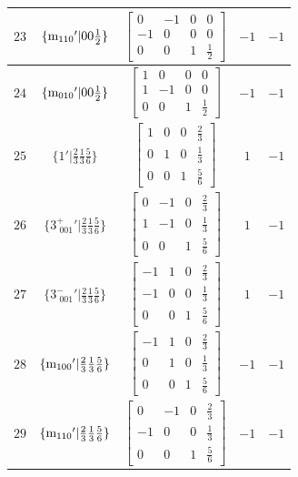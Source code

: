 \documentclass[fleqn,8pt]{jsarticle}
\begin{document}
\begin{longtable}{ccccc}
$ 23 $ & $ \{{\rm m}_{110}{}'|0 0 \frac{1}{2}\} $ & $ \begin{bmatrix} 0 & -1 & 0 & 0 \\ -1 & 0 & 0 & 0 \\ 0 & 0 & 1 & \frac{1}{2} \end{bmatrix} $ & $ -1 $ & $ -1 $ \\ \hline
$ 24 $ & $ \{{\rm m}_{010}{}'|0 0 \frac{1}{2}\} $ & $ \begin{bmatrix} 1 & 0 & 0 & 0 \\ 1 & -1 & 0 & 0 \\ 0 & 0 & 1 & \frac{1}{2} \end{bmatrix} $ & $ -1 $ & $ -1 $ \\ \hline
$ 25 $ & $ \{1{}'|\frac{2}{3} \frac{1}{3} \frac{5}{6}\} $ & $ \begin{bmatrix} 1 & 0 & 0 & \frac{2}{3} \\ 0 & 1 & 0 & \frac{1}{3} \\ 0 & 0 & 1 & \frac{5}{6} \end{bmatrix} $ & $ 1 $ & $ -1 $ \\ \hline
$ 26 $ & $ \{3^{+}_{\,\,001}{}'|\frac{2}{3} \frac{1}{3} \frac{5}{6}\} $ & $ \begin{bmatrix} 0 & -1 & 0 & \frac{2}{3} \\ 1 & -1 & 0 & \frac{1}{3} \\ 0 & 0 & 1 & \frac{5}{6} \end{bmatrix} $ & $ 1 $ & $ -1 $ \\ \hline
$ 27 $ & $ \{3^{-}_{\,\,001}{}'|\frac{2}{3} \frac{1}{3} \frac{5}{6}\} $ & $ \begin{bmatrix} -1 & 1 & 0 & \frac{2}{3} \\ -1 & 0 & 0 & \frac{1}{3} \\ 0 & 0 & 1 & \frac{5}{6} \end{bmatrix} $ & $ 1 $ & $ -1 $ \\ \hline
$ 28 $ & $ \{{\rm m}_{100}{}'|\frac{2}{3} \frac{1}{3} \frac{5}{6}\} $ & $ \begin{bmatrix} -1 & 1 & 0 & \frac{2}{3} \\ 0 & 1 & 0 & \frac{1}{3} \\ 0 & 0 & 1 & \frac{5}{6} \end{bmatrix} $ & $ -1 $ & $ -1 $ \\ \hline
$ 29 $ & $ \{{\rm m}_{110}{}'|\frac{2}{3} \frac{1}{3} \frac{5}{6}\} $ & $ \begin{bmatrix} 0 & -1 & 0 & \frac{2}{3} \\ -1 & 0 & 0 & \frac{1}{3} \\ 0 & 0 & 1 & \frac{5}{6} \end{bmatrix} $ & $ -1 $ & $ -1 $ \\ \hline

\end{longtable}
\end{document}
